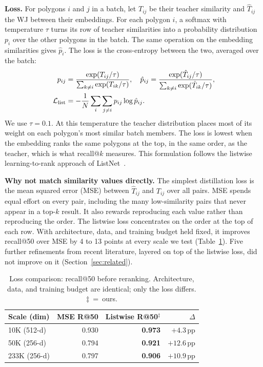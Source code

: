 \documentclass[conference]{IEEEtran}
\begin{document}
\noindent\textbf{Loss.} For polygons $i$ and $j$ in a batch, let $T_{ij}$ be their
teacher similarity and $\hat T_{ij}$ the WJ between their embeddings. For each
polygon $i$, a softmax with temperature $\tau$ turns its row of teacher similarities
into a probability distribution $p_i$ over the other polygons in the batch. The same
operation on the embedding similarities gives $\hat p_i$. The loss is the
cross-entropy between the two, averaged over the batch:
\begin{align}
  p_{ij}&=\frac{\exp(T_{ij}/\tau)}{\sum_{k\neq i}\exp(T_{ik}/\tau)},\quad
  \hat p_{ij}=\frac{\exp(\hat T_{ij}/\tau)}{\sum_{k\neq i}\exp(\hat T_{ik}/\tau)},\notag\\
  \mathcal{L}_{\mathrm{list}}&=-\frac{1}{N}\sum_i\sum_{j\neq i} p_{ij}\log\hat p_{ij}.
  \label{eq:distill}
\end{align}
We use $\tau=0.1$. At this temperature the teacher distribution places most of its
weight on each polygon's most similar batch members. The loss is lowest when the
embedding ranks the same polygons at the top, in the same order, as the teacher,
which is what recall@$k$ measures. This formulation follows the listwise
learning-to-rank approach of ListNet~\cite{cao07}.

\noindent\textbf{Why not match similarity values directly.} The simplest distillation
loss is the mean squared error (MSE) between $\hat T_{ij}$ and $T_{ij}$ over all
pairs. MSE spends equal effort on every pair, including the many low-similarity pairs
that never appear in a top-$k$ result. It also rewards reproducing each value rather
than reproducing the order. The listwise loss concentrates on the order at the top of
each row. With architecture, data, and training budget held fixed, it improves
recall@50 over MSE by 4 to 13 points at every scale we test
(Table~\ref{tab:lossablation}). Five further refinements from recent literature,
layered on top of the listwise loss, did not improve on it
(Section~\ref{sec:related}).

\begin{table}[t]\centering
\caption{Loss comparison: recall@50 before reranking. Architecture, data, and
training budget are identical; only the loss differs. $\ddagger$~=~ours.}
\label{tab:lossablation}\small\setlength{\tabcolsep}{5pt}
\begin{tabular}{@{}lrrr@{}}
\toprule
Scale (dim) & MSE R@50 & Listwise R@50$^\ddagger$ & $\Delta$ \\
\midrule
10K (512-d)  & 0.930 & \textbf{0.973} & $+4.3$\,pp \\
50K (256-d)  & 0.794 & \textbf{0.921} & $+12.6$\,pp \\
233K (256-d) & 0.797 & \textbf{0.906} & $+10.9$\,pp \\
\bottomrule
\end{tabular}
\end{table}
\end{document}
